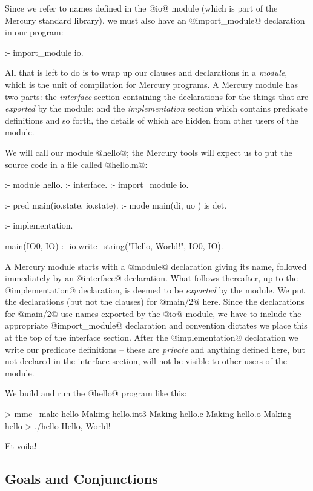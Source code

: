 Since we refer to names defined in the @io@ module (which is part of the
Mercury standard library), we must also have an @import_module@
declaration in our program:
\begin{myverbatim}
:- import_module io.
\end{myverbatim}

All that is left to do is to wrap up our clauses and declarations in a
\emph{module}, which is the unit of compilation for Mercury programs.  A
Mercury module has two parts: the \emph{interface} section containing the
declarations for the things that are \emph{exported} by the module; and the
\emph{implementation} section which contains predicate definitions and so
forth, the details of which are hidden from other users of the module.

We will call our module @hello@; the Mercury tools will expect us to put
the source code in a file called @hello.m@:
\begin{myverbatim}
:- module hello.
:- interface.
:- import_module io.

:- pred main(io.state, io.state).
:- mode main(di,       uo      ) is det.

:- implementation.

main(IO0, IO) :-
    io.write_string("Hello, World!\n", IO0, IO).
\end{myverbatim}
A Mercury module starts with a @module@ declaration giving its name,
followed immediately by an @interface@ declaration.  What follows
thereafter, up to the @implementation@ declaration, is deemed to be
\emph{exported} by the module.  We put the declarations (but not the
clauses) for @main/2@ here.  Since the declarations for @main/2@ use
names exported by the @io@ module, we have to include the appropriate
@import_module@ declaration and convention dictates we place this at the
top of the interface section.  After the @implementation@ declaration we
write our predicate definitions -- these are \emph{private} and anything
defined here, but not declared in the interface section, will not be
visible to other users of the module.

We build and run the @hello@ program like this:
\begin{myverbatim}
> mmc --make hello
Making hello.int3
Making hello.c
Making hello.o
Making hello
> ./hello
Hello, World!
\end{myverbatim}
Et voila!

\subsection{Goals and Conjunctions}

